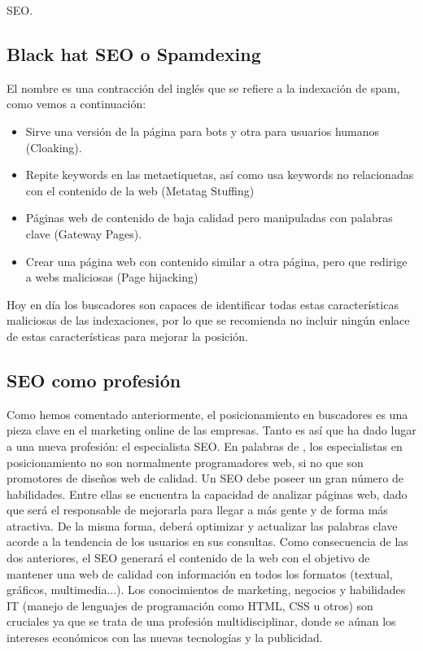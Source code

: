 \begin{section}{SEO.}
		\subsection{Black hat SEO o Spamdexing}
		El nombre es una contracción del inglés que se refiere a la indexación de spam, como vemos a continuación:
		\begin{itemize}
			\item Sirve una versión de la página para bots y otra para usuarios humanos (Cloaking).
			\item Repite keywords en las metaetiquetas, así como usa keywords no relacionadas con el contenido de la web (Metatag Stuffing)
			\item Páginas web de contenido de baja calidad pero manipuladas con palabras clave (Gateway Pages).
			\item Crear una página web con contenido similar a otra página, pero que redirige a webs maliciosas (Page hijacking)
		\end{itemize}
		
		Hoy en día los buscadores son capaces de identificar todas estas características maliciosas de las indexaciones, por lo que se recomienda no incluir ningún enlace de estas características para mejorar la posición.
	\end{section}
	
	\subsection{SEO como profesión}

		Como hemos comentado anteriormente, el posicionamiento en buscadores es una pieza clave en el marketing online de las empresas. Tanto es así que ha dado lugar a una nueva profesión: el especialista SEO. En palabras de \cite{seo-prof}, los especialistas en posicionamiento no son normalmente programadores web, si no que son promotores de diseños web de calidad. Un SEO debe poseer un gran número de habilidades. Entre ellas se encuentra la capacidad de analizar páginas web, dado que será el responsable de mejorarla para llegar a más gente y de forma más atractiva. De la misma forma, deberá optimizar y actualizar las palabras clave acorde a la tendencia de los usuarios en sus consultas. Como consecuencia de las dos anteriores, el SEO generará el contenido de la web con el objetivo de mantener una web de calidad con información en todos los formatos (textual, gráficos, multimedia...). Los conocimientos de marketing, negocios y habilidades IT (manejo de lenguajes de programación como HTML, CSS u otros) son cruciales ya que se trata de una profesión multidisciplinar, donde se aúnan los intereses económicos con las nuevas tecnologías y la publicidad.

